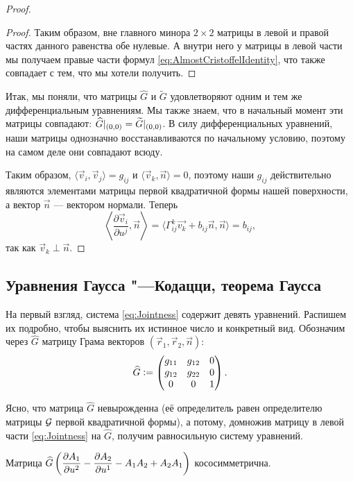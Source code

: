 \begin{proof}
\begin{proof}
		Таким образом, вне главного минора $2 \times 2$ матрицы в левой и правой частях данного равенства обе нулевые. А внутри него у матрицы в левой части мы получаем правые части формул \eqref{eq:AlmostCristoffelIdentity}, что также совпадает с тем, что мы хотели получить.
	\end{proof}

	Итак, мы поняли, что матрицы $\widehat{G}$ и $\widetilde{G}$ удовлетворяют одним и тем же дифференциальным уравнениям. Мы также знаем, что в начальный момент эти матрицы совпадают: $\widehat{G}|_{(0, 0)} \hm= \widetilde{G}|_{(0, 0)}$. В силу дифференциальных уравнений, наши матрицы однозначно восстанавливаются по начальному условию, поэтому на самом деле они совпадают всюду.

	Таким образом, $\langle\vec{v}_i, \vec{v}_j\rangle = g_{ij}$ и $\langle\vec{v}_k, \vec{n}\rangle = 0$, поэтому наши $g_{ij}$ действительно являются элементами матрицы первой квадратичной формы нашей поверхности, а вектор $\vec{n}$ --- вектором нормали. Теперь
	\[
		\left\langle\frac{\partial\vec{v}_i}{\partial u^j}, \vec{n}\right\rangle = \langle\Gamma_{ij}^k\vec{v_k} + b_{ij}\vec{n}, \vec{n}\rangle = b_{ij},
	\]
	так как $\vec{v}_k \perp \vec{n}$.
\end{proof}

\subsection{Уравнения Гаусса "---Кодацци, теорема Гаусса}

На первый взгляд, система \eqref{eq:Jointness} содержит девять уравнений. Распишем их подробно, чтобы выяснить их истинное число и конкретный вид. Обозначим через $\widehat{G}$ матрицу Грама векторов $(\vec{r}_1, \vec{r}_2, \vec{n})$:
\[
	\widehat{G} \vcentcolon =
	\begin{pmatrix}
		g_{11} & g_{12} & 0\\
		g_{12} & g_{22} & 0\\
		0 & 0 & 1
	\end{pmatrix}.
\]

Ясно, что матрица $\widehat{G}$ невырожденна (её определитель равен определителю матрицы $\mathcal{G}$ первой квадратичной формы), а потому, домножив матрицу в левой части \eqref{eq:Jointness} на $\widehat{G}$, получим равносильную систему уравнений.

\begin{lemma}
	Матрица $\displaystyle\widehat{G}\left(\frac{\partial A_1}{\partial u^2} - \frac{\partial A_2}{\partial u^1} - A_1A_2 + A_2A_1\right)$ кососимметрична.
\end{lemma}

